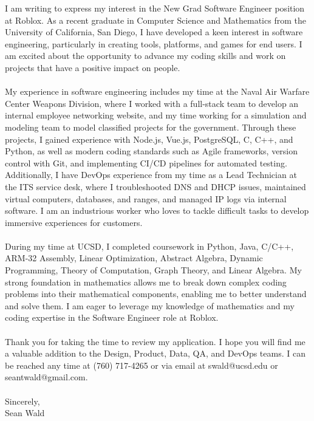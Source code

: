 \documentclass[]{article}
\begin{document}
I am writing to express my interest in the New Grad Software Engineer position at Roblox. As a recent graduate in Computer Science and Mathematics from the University of California, 
San Diego, I have developed a keen interest in software engineering, particularly in creating tools, platforms, and games for end users. I am excited about the opportunity to advance 
my coding skills and work on projects that have a positive impact on people. \\
\\
My experience in software engineering includes my time at the Naval Air Warfare Center Weapons Division, where I worked with a full-stack team to develop an internal employee networking website, 
and my time working for a simulation and modeling team to model classified projects for the government. Through these projects, I gained experience with Node.js, 
Vue.js, PostgreSQL, C, C++, and Python, as well as modern coding standards such as Agile frameworks, version control with Git, and implementing CI/CD pipelines for 
automated testing. Additionally, I have DevOps experience from my time as a Lead Technician at the ITS service desk, where I troubleshooted DNS and DHCP issues, 
maintained virtual computers, databases, and ranges, and managed IP logs via internal software. I am an industrious worker who loves to tackle difficult tasks to 
develop immersive experiences for customers.\\
\\
During my time at UCSD, I completed coursework in Python, Java, C/C++, ARM-32 Assembly, Linear Optimization, Abstract Algebra, Dynamic Programming, Theory of Computation, 
Graph Theory, and Linear Algebra. My strong foundation in mathematics allows me to break down complex coding problems into their mathematical components, enabling me to better 
understand and solve them. I am eager to leverage my knowledge of mathematics and my coding expertise in the Software Engineer role at Roblox.\\
\\
Thank you for taking the time to review my application. I hope you will find me a valuable addition to the
Design, Product, Data, QA, and DevOps teams. I can be reached any time at (760) 717-4265 or via email at
swald@ucsd.edu or seantwald@gmail.com.\\
\\
Sincerely,\\
Sean Wald
\end{document}
